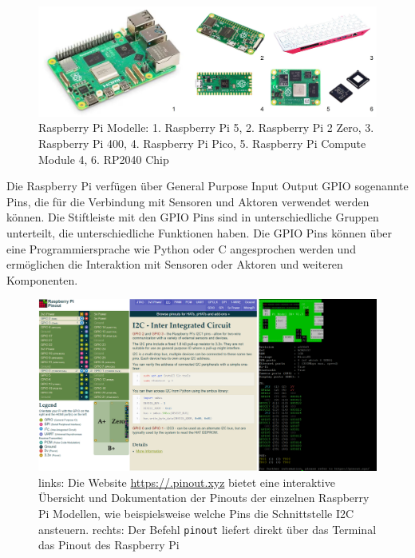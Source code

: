 \documentclass[
  11pt,
  a4paper,
  oneside, openany  ,captions=tableheading
]{scrbook}
\theoremstyle{remark}
\begin{document}
\begin{figure}[H]

{\centering \includegraphics{images/raspberry_pi_modelle.jpg}

}

\caption{Raspberry Pi Modelle: 1. Raspberry Pi 5, 2. Raspberry Pi 2
Zero, 3. Raspberry Pi 400, 4. Raspberry Pi Pico, 5. Raspberry Pi Compute
Module 4, 6. RP2040 Chip}

\end{figure}%

Die Raspberry Pi verfügen über General Purpose Input Output
GPIO sogenannte
Pins, die für die Verbindung mit Sensoren und Aktoren
verwendet werden können. Die Stiftleiste mit den GPIO Pins sind in
unterschiedliche Gruppen unterteilt, die unterschiedliche Funktionen
haben. Die GPIO Pins können über eine Programmiersprache wie Python oder
C angesprochen werden und ermöglichen die Interaktion mit Sensoren oder
Aktoren und weiteren Komponenten.

\begin{figure}[H]

{\centering \includegraphics{images/pinout.png}

}

\caption{links: Die Website \url{https://.pinout.xyz} bietet eine
interaktive Übersicht und Dokumentation der Pinouts der einzelnen
Raspberry Pi Modellen, wie beispielsweise welche Pins die Schnittstelle
I2C ansteuern. rechts: Der Befehl \texttt{pinout} liefert direkt über
das Terminal das Pinout des Raspberry Pi}

\end{figure}%
\end{document}
